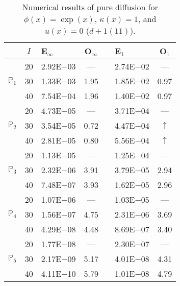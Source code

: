 \begin{table}[H]
\centering
\caption{Numerical results of pure diffusion for $\phi(x)=\exp(x)$, $\kappa(x)=1$, and $u(x)=0$ ($d+1(11)$).}
\begin{tabular}{@{}l c l c c l c@{}}
\toprule
 & $I$ & E$_{\infty}$ & O$_{\infty}$ && E$_1$ & O$_1$\\
\midrule
\multirow{3}{*}{$\mathbb{P}_{1}$}
 & 20 & 2.92E$-$03 & --- && 2.74E$-$02 & ---\\
 & 30 & 1.33E$-$03 & 1.95 && 1.85E$-$02 & 0.97\\
 & 40 & 7.54E$-$04 & 1.96 && 1.40E$-$02 & 0.97\\
\midrule
\multirow{3}{*}{$\mathbb{P}_{2}$}
 & 20 & 4.73E$-$05 & --- && 3.71E$-$04 & ---\\
 & 30 & 3.54E$-$05 & 0.72 && 4.47E$-$04 & $\uparrow$\\
 & 40 & 2.81E$-$05 & 0.80 && 5.56E$-$04 & $\uparrow$\\
\midrule
\multirow{3}{*}{$\mathbb{P}_{3}$}
 & 20 & 1.13E$-$05 & --- && 1.25E$-$04 & ---\\
 & 30 & 2.32E$-$06 & 3.91 && 3.79E$-$05 & 2.94\\
 & 40 & 7.48E$-$07 & 3.93 && 1.62E$-$05 & 2.96\\
\midrule
\multirow{3}{*}{$\mathbb{P}_{4}$}
 & 20 & 1.07E$-$06 & --- && 1.03E$-$05 & ---\\
 & 30 & 1.56E$-$07 & 4.75 && 2.31E$-$06 & 3.69\\
 & 40 & 4.29E$-$08 & 4.48 && 8.69E$-$07 & 3.40\\
\midrule
\multirow{3}{*}{$\mathbb{P}_{5}$}
 & 20 & 1.77E$-$08 & --- && 2.30E$-$07 & ---\\
 & 30 & 2.17E$-$09 & 5.17 && 4.01E$-$08 & 4.31\\
 & 40 & 4.11E$-$10 & 5.79 && 1.01E$-$08 & 4.79\\
\bottomrule
\end{tabular}
\end{table}